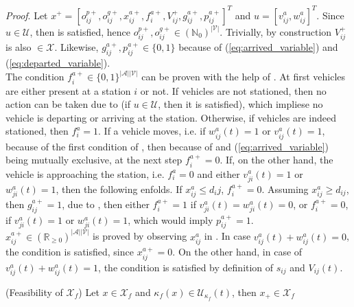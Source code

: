 \textit{Proof}. Let $x^+ = [o_{ij}^{p+}, o_{ij}^{g+}, x_{ij}^{a+}, f^{a+}_{i}, V_{ij}^{+}, g^{a+}_{ij}, p^{a+}_{ij}]^T$ and $u = [v^{a}_{ij}, w^{a}_{ij}]^T$. Since $u \in \mathcal{U}$, then  is satisfied, hence $o_{ij}^{p+}, o_{ij}^{g+} \in (\mathbb{N}_0)^{|\mathcal{V}|}$. Trivially, by construction $V_{ij}^{+}$ is also $\in \mathcal{X}$. Likewise, $g^{a+}_{ij}, p^{a+}_{ij} \in \{0,1\}$ because of (\ref{eq:arrived_variable}) and (\ref{eq:departed_variable}). \\
The condition $f^{a+}_{i} \in \{0,1\}^{|\mathcal{A}||\mathcal{V}|}$ can be proven with the help of . At first vehicles are either present at a station $i$ or not. If vehicles are not stationed, then no action can be taken due to  (if $u \in \mathcal{U}$, then it is satisfied), which impliese no vehicle is departing or arriving at the station. Otherwise, if vehicles are indeed stationed, then $f^{a}_{i} = 1$. If a vehicle moves, i.e. if $w^a_{ij}(t) = 1$ or $v^a_{ij}(t) = 1$, because of the first condition of , then because of  and (\ref{eq:arrived_variable}) being mutually exclusive, at the next step $f^{a+}_{i} =0$. If, on the other hand, the vehicle is approaching the station, i.e. $f^{a}_{i} =0$ and 
either $v^a_{ji}(t) = 1$ or $w^a_{ji}(t) = 1$, then the following enfolds. If $x_{ij}^{a} \leq d_ij$, $f^{a+}_{i} =0$. Assuming $x_{ij}^{a} \ge d_{ij}$, then $g^{a+}_{ij} = 1$, due to , then either $f^{a+}_{i} =1$ if  $v^a_{ji}(t) = w^a_{ji}(t) = 0$, or $f^{a+}_{i} =0$, if $v^a_{ji}(t) = 1$ or $w^a_{ji}(t) = 1$, which would imply $p^{a+}_{ij}=1$. \\
 $x_{ij}^{a+}\in (\mathbb{R}_{\ge 0})^{|\mathcal{A}||\mathcal{V}|}$ is proved by observing $x_{ij}^a$ in  . In case $v^a_{ij}(t) + w^a_{ij}(t)= 0$, the condition is satisfied, since  $x_{ij}^{a+} = 0$.  On the other hand, in case of $v^a_{ij}(t) + w^a_{ij}(t)= 1$, the condition is satisfied by definition of $s_{ij}$ and $V_{ij}(t)$. \\

\begin{proposition}{(Feasibility of $\mathcal{X}_f$)}\label{pro:feas_xf}
	Let $x \in \mathcal{X}_f$ and $\kappa_f(x) \in \mathcal{U}_{\kappa_f}(t)$, then $x_+\in \mathcal{X}_f$
\end{proposition}\\


